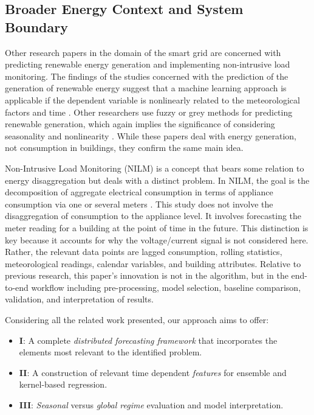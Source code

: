 \documentclass[conference]{IEEEtran}
\begin{document}
\subsection{Broader Energy Context and System Boundary}

Other research papers in the domain of the smart grid are concerned with predicting renewable energy generation and implementing non-intrusive load monitoring. The findings of the studies concerned with the prediction of the generation of renewable energy suggest that a machine learning approach is applicable if the dependent variable is nonlinearly related to the meteorological factors and time \cite{Rahman2021HRESANN}. Other researchers use fuzzy or grey methods for predicting renewable generation, which again implies the significance of considering seasonality and nonlinearity \cite{Cao2021RT3FLS,Qian2021SADGM}. While these papers deal with energy generation, not consumption in buildings, they confirm the same main idea.

Non-Intrusive Load Monitoring (NILM) is a concept that bears some relation to energy disaggregation but deals with a distinct problem. In NILM, the goal is the decomposition of aggregate electrical consumption in terms of appliance consumption via one or several meters \cite{Zoha2012NILMSurvey}. This study does not involve the disaggregation of consumption to the appliance level. It involves forecasting the meter reading for a building at the point of time in the future. This distinction is key because it accounts for why the voltage/current signal is not considered here. Rather, the relevant data points are lagged consumption, rolling statistics, meteorological readings, calendar variables, and building attributes. Relative to previous research, this paper's innovation is not in the algorithm, but in the end-to-end workflow including pre-processing, model selection, baseline comparison, validation, and interpretation of results.

Considering all the related work presented, our approach aims to offer: 
\begin{itemize}
    \item \textbf{I}:  A complete \textit{distributed forecasting framework} that incorporates the elements most relevant to the identified problem.
    \item \textbf{II}: A construction of relevant time dependent \textit{features} for ensemble and kernel-based regression.
    \item \textbf{III}: \textit{Seasonal} versus \textit{global regime} evaluation and model interpretation.
\end{itemize}
\end{document}
